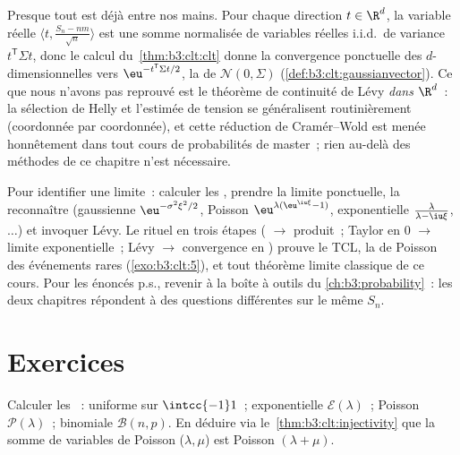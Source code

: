 \begin{remark}\label{rem:b3:clt:multiclt}
Presque tout est déjà entre nos mains. Pour chaque
direction $t \in \R^d$, la variable réelle $\langle t,
\frac{S_n - nm}{\sqrt n}\rangle$ est une somme normalisée
de variables réelles i.i.d.\ de variance $t^{\mathsf
T}\Sigma t$, donc le calcul du~\cref{thm:b3:clt:clt} donne
la convergence ponctuelle des 
$d$-dimensionnelles vers $\eu^{-t^{\mathsf T}\Sigma t/2}$,
la  de $\mathcal N(0, \Sigma)$
(\cref{def:b3:clt:gaussianvector}). Ce que nous n'avons pas
reprouvé est le théorème de continuité de Lévy \emph{dans
$\R^d$}~: la sélection de Helly et l'estimée de tension se
généralisent routinièrement (coordonnée par coordonnée), et
cette réduction de Cramér--Wold est menée honnêtement dans
tout cours de probabilités de master~; rien au-delà des
méthodes de ce chapitre n'est nécessaire.
\end{remark}

\begin{method}\label{met:b3:clt:method}
Pour identifier une  limite~: calculer les , prendre la limite ponctuelle, la
reconnaître (gaussienne $\eu^{-\sigma^2\xi^2/2}$, Poisson
$\eu^{\lambda(\eu^{\iu\xi}-1)}$, exponentielle
$\frac{\lambda}{\lambda - \iu\xi}$, $\dots$) et invoquer
Lévy. Le rituel en trois étapes ( $\to$
produit~; Taylor en $0$ $\to$ limite exponentielle~; Lévy
$\to$ convergence en ) prouve le TCL, la  de Poisson
des événements rares (\cref{exo:b3:clt:5}), et tout
théorème limite classique de ce cours. Pour les énoncés
p.s., revenir à la boîte à outils du
\cref{ch:b3:probability}~: les deux chapitres répondent à
des questions différentes sur le même $S_n$.
\end{method}


\section{Exercices}

\begin{exercise}[$\star$]\label{exo:b3:clt:1}
Calculer les ~: uniforme sur
$\intcc{-1}1$~; exponentielle $\mathcal E(\lambda)$~;
Poisson $\mathcal P(\lambda)$~; binomiale $\mathcal B(n,
p)$. En déduire via le~\cref{thm:b3:clt:injectivity} que la
somme de variables de Poisson  ($\lambda,
\mu$) est Poisson $(\lambda + \mu)$.
\end{exercise}

